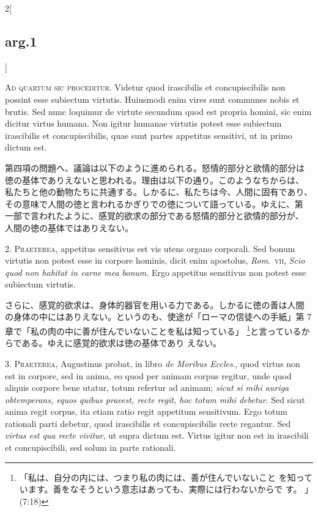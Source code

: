 \documentclass[paper=a4paper,fontsize=10pt,jafontsize=9pt,titlepage]{jlreq}
\begin{document}
\begin{paracol}{2}[\subsection{arg.1}]

{\scshape Ad quartum sic proceditur}. Videtur quod irascibilis et
concupiscibilis non possint esse subiectum virtutis. Huiusmodi enim
vires sunt communes nobis et brutis. Sed nunc loquimur de virtute
secundum quod est propria homini, sic enim dicitur virtus humana. Non
igitur humanae virtutis potest esse subiectum irascibilis et
concupiscibilis, quae sunt partes appetitus sensitivi, ut in primo
dictum est.

\switchcolumn

第四項の問題へ、議論は以下のように進められる。怒情的部分と欲情的部分は
徳の基体でありえないと思われる。理由は以下の通り。このようなちからは、
私たちと他の動物たちに共通する。しかるに、私たちは今、人間に固有であり、
その意味で人間の徳と言われるかぎりでの徳について語っている。ゆえに、第
一部で言われたように、感覚的欲求の部分である怒情的部分と欲情的部分が、
人間の徳の基体ではありえない。


2. {\scshape Praeterea}, appetitus sensitivus est vis utens organo
corporali. Sed bonum virtutis non potest esse in corpore hominis,
dicit enim apostolus, {\itshape Rom}.~{\scshape vii}, {\itshape Scio
quod non habitat in carne mea bonum}. Ergo appetitus sensitivus non
potest esse subiectum virtutis.

\switchcolumn

さらに、感覚的欲求は、身体的器官を用いる力である。しかるに徳の善は人間
の身体の中にはありえない。というのも、使途が「ローマの信徒への手紙」第
7章で「私の肉の中に善が住んでいないことを私は知っている」
\footnote{「私は、自分の内には、つまり私の肉には、善が住んでいないこと
を知っています。善をなそうという意志はあっても、実際には行わないからで
す。 」(7:18)}と言っているからである。ゆえに感覚的欲求は徳の基体であり
えない。


3. {\scshape Praeterea}, Augustinus probat, in libro {\itshape de
Moribus Eccles}., quod virtus non est in corpore, sed in anima, eo
quod per animam corpus regitur, unde quod aliquis corpore bene utatur,
totum refertur ad animam; {\itshape sicut si mihi auriga obtemperans,
equos quibus praeest, recte regit, hoc totum mihi debetur}. Sed sicut
anima regit corpus, ita etiam ratio regit appetitum sensitivum. Ergo
totum rationali parti debetur, quod irascibilis et concupiscibilis
recte regantur. Sed {\itshape virtus est qua recte vivitur}, ut supra
dictum est. Virtus igitur non est in irascibili et concupiscibili, sed
solum in parte rationali.


\end{paracol}
\end{document}
